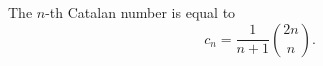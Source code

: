 

\setcounter{section}{4}
\setcounter{subsection}{2}
\setcounter{dfn}{3}

\begin{thm}
\label{thm:CatalanFormula}
The $n$-th Catalan number is equal to
\begin{equation}
\label{eqn:CatalanFormula}
c_n = \frac1{n+1} \binom{2n}{n}.
\end{equation}
\end{thm}

